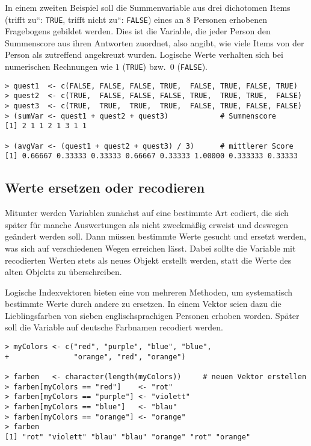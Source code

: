 In einem zweiten Beispiel soll die Summenvariable aus drei dichotomen Items ({\quotedblbase}trifft zu{\textquotedblleft}: \lstinline!TRUE!, {\quotedblbase}trifft nicht zu{\textquotedblleft}: \lstinline!FALSE!) eines an $8$ Personen erhobenen Fragebogens gebildet werden. Dies ist die Variable, die jeder Person den Summenscore aus ihren Antworten zuordnet, also angibt, wie viele Items von der Person als zutreffend angekreuzt wurden. Logische Werte verhalten sich bei numerischen Rechnungen wie $1$ (\lstinline!TRUE!) bzw.\ $0$ (\lstinline!FALSE!).
\begin{lstlisting}
> quest1  <- c(FALSE, FALSE, FALSE, TRUE,  FALSE, TRUE, FALSE, TRUE)
> quest2  <- c(TRUE,  FALSE, FALSE, FALSE, TRUE,  TRUE, TRUE,  FALSE)
> quest3  <- c(TRUE,  TRUE,  TRUE,  TRUE,  FALSE, TRUE, FALSE, FALSE)
> (sumVar <- quest1 + quest2 + quest3)            # Summenscore
[1] 2 1 1 2 1 3 1 1

> (avgVar <- (quest1 + quest2 + quest3) / 3)      # mittlerer Score
[1] 0.66667 0.33333 0.33333 0.66667 0.33333 1.00000 0.333333 0.33333
\end{lstlisting}

\subsection{Werte ersetzen oder recodieren}
\label{sec:recode}

Mitunter werden Variablen zunächst auf eine bestimmte Art codiert, die sich später für manche Auswertungen als nicht zweckmäßig erweist und deswegen geändert werden soll. Dann müssen bestimmte Werte gesucht und ersetzt werden, was sich auf verschiedenen Wegen erreichen lässt. Dabei sollte die Variable mit recodierten Werten stets als neues Objekt erstellt werden, statt die Werte des alten Objekts zu überschreiben.

Logische Indexvektoren bieten eine von mehreren Methoden, um systematisch bestimmte Werte durch andere zu ersetzen. In einem Vektor seien dazu die Lieblingsfarben von sieben englischsprachigen Personen erhoben worden. Später soll die Variable auf deutsche Farbnamen recodiert werden.
\begin{lstlisting}
> myColors <- c("red", "purple", "blue", "blue",
+               "orange", "red", "orange")

> farben   <- character(length(myColors))     # neuen Vektor erstellen
> farben[myColors == "red"]    <- "rot"
> farben[myColors == "purple"] <- "violett"
> farben[myColors == "blue"]   <- "blau"
> farben[myColors == "orange"] <- "orange"
> farben
[1] "rot" "violett" "blau" "blau" "orange" "rot" "orange"
\end{lstlisting}

